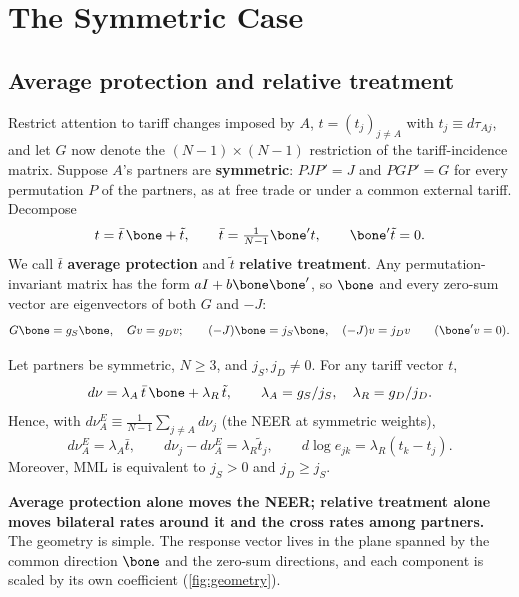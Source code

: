\section{The Symmetric Case}
\label{sec:symmetric}

\subsection{Average protection and relative treatment}
\label{sec:decomposition}

Restrict attention to tariff changes imposed by $A$, $t=(t_j)_{j\neq A}$ with $t_j\equiv d\tau_{Aj}$, and let $G$ now denote the $(N-1)\times(N-1)$ restriction of the tariff-incidence matrix. Suppose $A$'s partners are \textbf{symmetric}: $PJP'=J$ and $PGP'=G$ for every permutation $P$ of the partners, as at free trade or under a common external tariff. Decompose
\begin{equation}
t=\bar t\,\bone+\tilde t,\qquad \bar t=\tfrac{1}{N-1}\bone't,\qquad \bone'\tilde t=0.
\label{eq:tsplit}
\end{equation}
We call $\bar t$ \textbf{average protection} and $\tilde t$ \textbf{relative treatment}. Any permutation-invariant matrix has the form $aI+b\bone\bone'$, so $\bone$ and every zero-sum vector are eigenvectors of both $G$ and $-J$:
\begin{equation*}
G\bone=g_S\bone,\quad Gv=g_Dv;\qquad (-J)\bone=j_S\bone,\quad (-J)v=j_Dv\qquad(\bone'v=0).
\end{equation*}

\begin{proposition}
\label{prop:decomposition}
Let partners be symmetric, $N\geq3$, and $j_S,j_D\neq0$. For any tariff vector $t$,
\begin{equation}
d\nu=\lambda_A\,\bar t\,\bone+\lambda_R\,\tilde t,\qquad \lambda_A=g_S/j_S,\quad \lambda_R=g_D/j_D.
\label{eq:decomp}
\end{equation}
Hence, with $d\nu^E_A\equiv\frac{1}{N-1}\sum_{j\neq A}d\nu_j$ (the NEER at symmetric weights),
\begin{equation}
d\nu^E_A=\lambda_A\bar t,\qquad d\nu_j-d\nu^E_A=\lambda_R\tilde t_j,\qquad d\log e_{jk}=\lambda_R(t_k-t_j).
\label{eq:decompparts}
\end{equation}
Moreover, MML is equivalent to $j_S>0$ and $j_D\geq j_S$.
\end{proposition}

\textbf{Average protection alone moves the NEER; relative treatment alone moves bilateral rates around it and the cross rates among partners.} The geometry is simple. The response vector lives in the plane spanned by the common direction $\bone$ and the zero-sum directions, and each component is scaled by its own coefficient (\cref{fig:geometry}).

